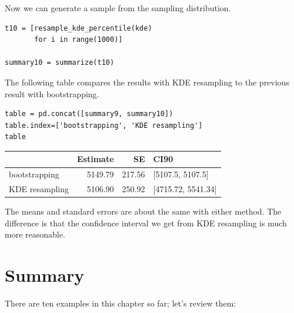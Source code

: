 Now we can generate a sample from the sampling distribution.

\begin{lstlisting}[]
t10 = [resample_kde_percentile(kde)
       for i in range(1000)]

summary10 = summarize(t10)
\end{lstlisting}

The following table compares the results with KDE resampling to the
previous result with bootstrapping.

\begin{lstlisting}[]
table = pd.concat([summary9, summary10])
table.index=['bootstrapping', 'KDE resampling']
table
\end{lstlisting}

\begin{tabular}{lrrl}
\midrule
{} &  Estimate &      SE &                CI90 \\
\midrule
bootstrapping  &   5149.79 &  217.56 &    [5107.5, 5107.5] \\
KDE resampling &   5106.90 &  250.92 &  [4715.72, 5541.34] \\
\midrule
\end{tabular}

The means and standard errors are about the same with either method. The
difference is that the confidence interval we get from KDE resampling is
much more reasonable.

\hypertarget{summary}{%
\section{Summary}\label{summary}}

There are ten examples in this chapter so far; let's review them:

